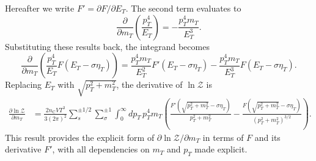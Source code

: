 \documentclass[epjST]{svjour}
\begin{document}
Hereafter we write \(F'=\partial F/\partial E_{T}\). The second term evaluates to
\begin{equation}
    \frac{\partial}{\partial m_{T}} \left( \frac{p_{T}^{4}}{E_{T}} \right) = -\frac{p_{T}^{4} m_{T}}{E_{T}^{3}}.
\end{equation}
Substituting these results back, the integrand becomes
\begin{equation}
    \frac{\partial}{\partial m_{T}} \left( \frac{p_{T}^{4}}{E_{T}} F(E_{T} - \sigma\eta_{T}) \right) = \frac{p_{T}^{4} m_{T}}{E_{T}^{2}} F'(E_{T} - \sigma\eta_{T}) - \frac{p_{T}^{4} m_{T}}{E_{T}^{3}} F(E_{T} - \sigma\eta_{T}).
\end{equation}
Replacing \(E_{T}\) with \(\sqrt{p_{T}^{2} + m_{T}^{2}}\), the derivative of \(\ln \mathcal{Z}\) is
\begin{align}
    \frac{\partial \ln \mathcal{Z}}{\partial m_{T}} &= \frac{2 n_\mathrm{C} V T^{3}}{3 (2\pi)^{2}} \sum_{s}^{\pm1/2}\sum_{\sigma}^{\pm1} \int_{0}^{\infty} dp_{T} \, p_{T}^{4} m_{T}
    \left( \frac{F'\left( \sqrt{p_{T}^{2} + m_{T}^{2}} - \sigma\eta_{T} \right)}{p_{T}^{2} + m_{T}^{2}} - \frac{F\left( \sqrt{p_{T}^{2} + m_{T}^{2}} - \sigma\eta_{T} \right)}{(p_{T}^{2} + m_{T}^{2})^{3/2}} \right).
\end{align}
This result provides the explicit form of \(\partial \ln \mathcal{Z}/\partial m_{T}\) in terms of \(F\) and its derivative \(F'\), with all dependencies on \(m_{T}\) and \(p_{T}\) made explicit.
\end{document}
